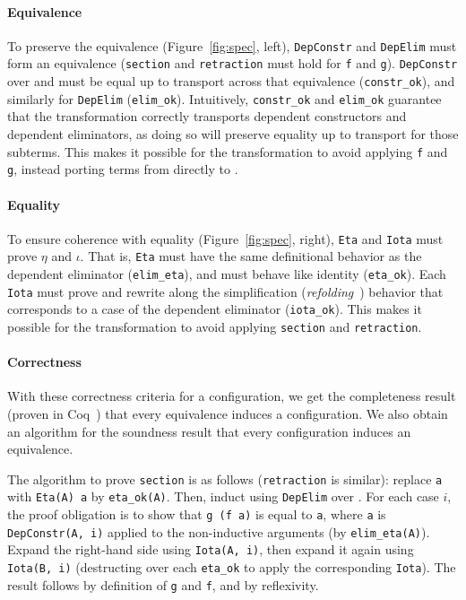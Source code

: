 \paragraph{Equivalence}
To preserve the equivalence (Figure~\ref{fig:spec}, left), \lstinline{DepConstr} and \lstinline{DepElim} must form an equivalence
(\lstinline{section} and \lstinline{retraction} must hold for \lstinline{f} and \lstinline{g}).
\lstinline{DepConstr} over \Aa and \B must be equal up to transport across that equivalence (\lstinline{constr_ok}), 
and similarly for \lstinline{DepElim} (\lstinline{elim_ok}).
Intuitively, \lstinline{constr_ok} and \lstinline{elim_ok} guarantee that the transformation
correctly transports dependent constructors and dependent eliminators,
as doing so will preserve equality up to transport for those subterms.
This makes it possible for the transformation
to avoid applying \lstinline{f} and \lstinline{g}, instead porting terms from \Aa directly to \B.

\paragraph{Equality}
To ensure coherence with equality (Figure~\ref{fig:spec}, right),
\lstinline{Eta} and \lstinline{Iota} must prove $\eta$ and $\iota$.
That is, \lstinline{Eta} must have the same definitional behavior as the dependent eliminator (\lstinline{elim_eta}),
and must behave like identity (\lstinline{eta_ok}).
Each \lstinline{Iota} must prove and rewrite along the simplification (\textit{refolding}~\cite{boutillier:tel-01054723}) behavior that corresponds to a case of the dependent eliminator (\lstinline{iota_ok}).
This makes it possible for the transformation to
avoid applying \lstinline{section} and \lstinline{retraction}.

\paragraph{Correctness}
With these correctness criteria for a configuration, we get the completeness result (proven in Coq~\href{https://github.com/uwplse/pumpkin-pi/blob/v2.0.0/plugin/coq/playground/arbitrary.v}{}) that every equivalence induces a configuration. %
We also obtain an algorithm for the soundness result that every configuration induces an equivalence.

The algorithm to prove \lstinline{section} is as follows (\lstinline{retraction} is similar):
replace \lstinline{a} with \lstinline{Eta(A) a} by \lstinline{eta_ok(A)}.
Then, induct using \lstinline{DepElim} over \Aa.
For each case $i$, the proof obligation is to show that \lstinline{g (f a)} is equal to \lstinline{a},
where \lstinline{a} is \lstinline{DepConstr(A, i)} applied to the non-inductive arguments (by \lstinline{elim_eta(A)}).
Expand the right-hand side using \lstinline{Iota(A, i)}, then expand it again using \lstinline{Iota(B, i)}
(destructing over each \lstinline{eta_ok} to apply the corresponding \lstinline{Iota}).
The result follows by definition of \lstinline{g} and \lstinline{f}, and by reflexivity.

